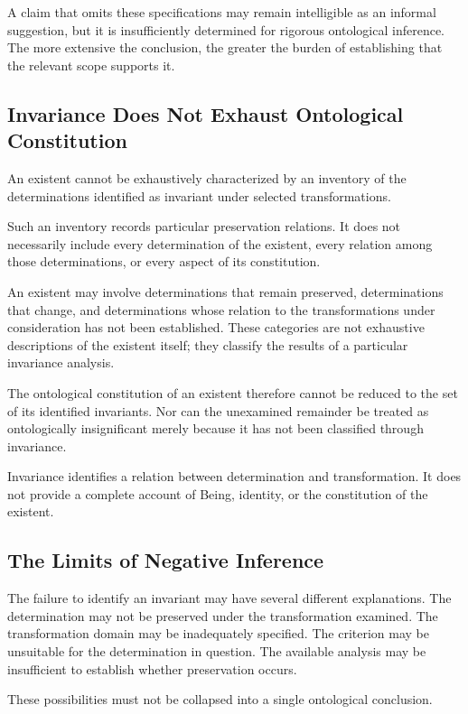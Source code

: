 A claim that omits these specifications may remain
intelligible as an informal suggestion, but it is
insufficiently determined for rigorous ontological
inference. The more extensive the conclusion, the
greater the burden of establishing that the relevant
scope supports it.

\subsection{Invariance Does Not Exhaust Ontological Constitution}

An existent cannot be exhaustively characterized by
an inventory of the determinations identified as
invariant under selected transformations.

Such an inventory records particular preservation
relations. It does not necessarily include every
determination of the existent, every relation among
those determinations, or every aspect of its constitution.

An existent may involve determinations that remain
preserved, determinations that change, and determinations
whose relation to the transformations under consideration
has not been established. These categories are not
exhaustive descriptions of the existent itself; they
classify the results of a particular invariance analysis.

The ontological constitution of an existent therefore
cannot be reduced to the set of its identified invariants.
Nor can the unexamined remainder be treated as
ontologically insignificant merely because it has
not been classified through invariance.

Invariance identifies a relation between determination
and transformation. It does not provide a complete
account of Being, identity, or the constitution of
the existent.

\subsection{The Limits of Negative Inference}

The failure to identify an invariant may have several
different explanations. The determination may not
be preserved under the transformation examined. The
transformation domain may be inadequately specified.
The criterion may be unsuitable for the determination
in question. The available analysis may be insufficient
to establish whether preservation occurs.

These possibilities must not be collapsed into a
single ontological conclusion.

